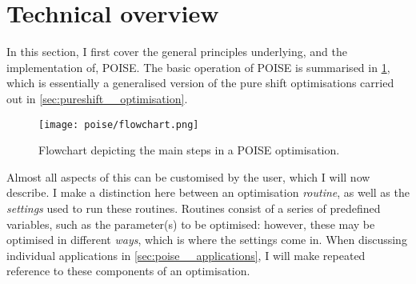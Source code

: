 \section{Technical overview}
\label{sec:poise__technical}

In this section, I first cover the general principles underlying, and the implementation of, POISE.
The basic operation of POISE is summarised in \cref{fig:poise_flowchart}, which is essentially a generalised version of the pure shift optimisations carried out in \cref{sec:pureshift__optimisation}.

\begin{figure}[htb]
    \centering
    \texttt{[image: poise/flowchart.png]}%
    \caption[Flowchart for POISE optimisations]{Flowchart depicting the main steps in a POISE optimisation.}
    \label{fig:poise_flowchart}
\end{figure}

Almost all aspects of this can be customised by the user, which I will now describe.
I make a distinction here between an optimisation \textit{routine}, as well as the \textit{settings} used to run these routines.
Routines consist of a series of predefined variables, such as the parameter(s) to be optimised: however, these may be optimised in different \textit{ways}, which is where the settings come in.
When discussing individual applications in \cref{sec:poise__applications}, I will make repeated reference to these components of an optimisation.





